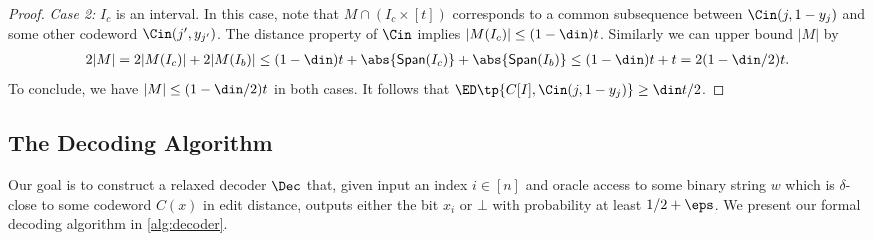 \begin{proof}
\textit{Case 2:} $I_c$ is an interval.
In this case, note that $M \cap (I_c \times [t])$ corresponds to a common subsequence between $\Cin(j,1-y_j)$ and some other codeword $\Cin(j', y_{j'})$. 
The distance property of $\Cin$ implies $|M(I_c)| \le (1-\din)t$.
Similarly we can upper bound $|M|$ by
\begin{align*}
	2|M| = 2|M(I_c)| + 2|M(I_b)| \le (1-\din)t + \abs{\textsf{Span}(I_c)} + \abs{\textsf{Span}(I_b)} \le (1-\din)t + t = 2(1-\din/2)t.
\end{align*}
To conclude, we have $|M| \le (1-\din/2)t$ in both cases. It follows that $\ED\tp{C[I], \Cin(j,1-y_j)}\ge \din t/2$.
\end{proof}

\subsection{The Decoding Algorithm}\label{sec:wrldc-dec}
Our goal is to construct a relaxed decoder $\Dec$ that, given input an index $i \in [n]$ and oracle access to some binary string $w$ which is $\delta$-close to some codeword $C(x)$ in edit distance, outputs either the bit $x_i$ or $\bot$ with probability at least $1/2 + \eps$. 
We present our formal decoding algorithm in \cref{alg:decoder}.

